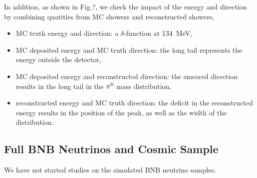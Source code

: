 In addition, as shown in Fig.?,
we check the impact of the energy and direction by
combining quatities from MC showers
and reconstructed showers,
\begin{itemize}
\item MC truth energy and direction: a $\delta$-function at 134~MeV,
\item MC deposited energy and MC truth direction: the long tail
      represents the energy outside the detector,
\item MC deposited energy and reconstructed direction: the smeared
      direction results in the long tail in the ${\pi}^0$ mass distribution,
\item reconstructed energy and MC truth direction: the deficit in
      the reconstructed energy results in the position of the peak,
      as well as the width of the distribution.
\end{itemize}

\subsection{Full BNB Neutrinos and Cosmic Sample}
\label{sec:bnb}

We have not started studies on the simulated BNB neutrino samples.


